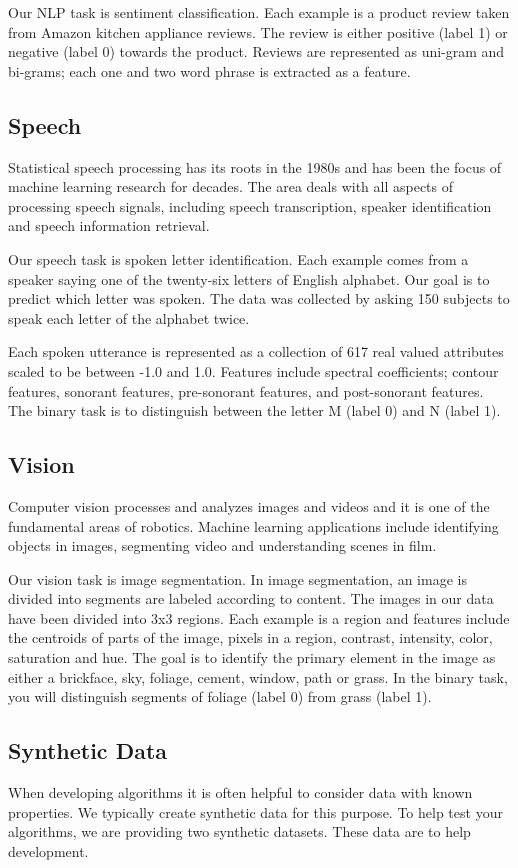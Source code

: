 \documentclass[11pt]{article}
\begin{document}
	Our NLP task is sentiment classification. Each example is a product review taken from Amazon kitchen appliance reviews. The review is either positive (label 1) or negative (label 0) towards the product. Reviews are represented as uni-gram and bi-grams; each one and two word phrase is extracted as a feature.
	
	\subsection{Speech}
	Statistical speech processing has its roots in the 1980s and has been the focus of machine learning research for decades. The area deals with all aspects of processing speech signals, including speech transcription, speaker identification and speech information retrieval.
	
	Our speech task is spoken letter identification. Each example comes from a speaker saying one of the twenty-six letters of English alphabet. Our goal is to predict which letter was spoken. The data was collected by asking 150 subjects to speak each letter of the alphabet twice.
	
	Each spoken utterance is represented as a collection of 617 real valued attributes scaled to be between -1.0 and 1.0. Features include spectral coefficients; contour features, sonorant features, pre-sonorant features, and post-sonorant features. The binary task is to distinguish between the letter M (label 0) and N (label 1).
	
	\subsection{Vision}
	Computer vision processes and analyzes images and videos and it is one of the fundamental areas of robotics. Machine learning applications include identifying objects in images, segmenting video and understanding scenes in film.
	
	Our vision task is image segmentation. In image segmentation, an image is divided into segments are labeled according to content. The images in our data have been divided into 3x3 regions. Each example is a region and features include the centroids of parts of the image, pixels in a region, contrast, intensity, color, saturation and hue. The goal is to identify the primary element in the image as either a brickface, sky, foliage, cement, window, path or grass. In the binary task, you will distinguish segments of foliage (label 0) from grass (label 1).
	
	\subsection{Synthetic Data}
	When developing algorithms it is often helpful to consider data with known properties. We typically create synthetic data for this purpose. To help test your algorithms, we are providing two synthetic datasets. These data are to help development.
	
\end{document}
